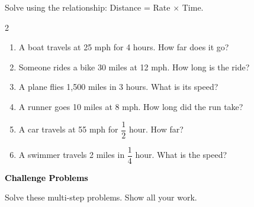 \documentclass[12pt, letterpaper, fleqn]{article}
\begin{document}
\noindent
Solve using the relationship: Distance = Rate $\times$ Time.

\vspace{3mm}

\begin{multicols}{2}
\begin{enumerate}[itemsep=3cm, leftmargin=0.6cm]

\item A boat travels at 25 mph for 4 hours. How far does it go?
\vspace{2cm}

\item Someone rides a bike 30 miles at 12 mph. How long is the ride?
\vspace{2cm}

\item A plane flies 1,500 miles in 3 hours. What is its speed?
\vspace{2cm}

\item A runner goes 10 miles at 8 mph. How long did the run take?
\vspace{2cm}

\item A car travels at 55 mph for $\dfrac{1}{2}$ hour. How far?
\vspace{2cm}

\item A swimmer travels 2 miles in $\dfrac{1}{4}$ hour. What is the speed?
\vspace{2cm}

\end{enumerate}
\end{multicols}

\newpage

\begin{tcolorbox}[colback=customteal!20]
\large\textcolor{black}{\textbf{Challenge Problems}}
\end{tcolorbox}

\noindent
Solve these multi-step problems. Show all your work.

\vspace{3mm}
\end{document}
